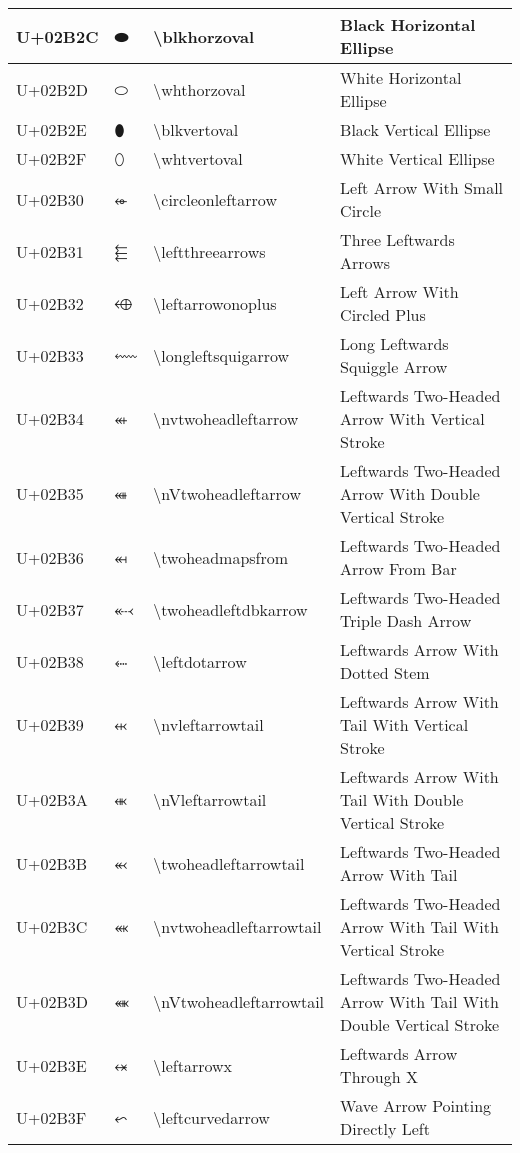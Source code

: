 \begin{table}[h]
\begin{tabulary}{\linewidth}{|L|L|L|L|}
\hline
U+02B2C & ⬬ & {\textbackslash}blkhorzoval & Black Horizontal Ellipse \\
\hline
U+02B2D & ⬭ & {\textbackslash}whthorzoval & White Horizontal Ellipse \\
\hline
U+02B2E & ⬮ & {\textbackslash}blkvertoval & Black Vertical Ellipse \\
\hline
U+02B2F & ⬯ & {\textbackslash}whtvertoval & White Vertical Ellipse \\
\hline
U+02B30 & ⬰ & {\textbackslash}circleonleftarrow & Left Arrow With Small Circle \\
\hline
U+02B31 & ⬱ & {\textbackslash}leftthreearrows & Three Leftwards Arrows \\
\hline
U+02B32 & ⬲ & {\textbackslash}leftarrowonoplus & Left Arrow With Circled Plus \\
\hline
U+02B33 & ⬳ & {\textbackslash}longleftsquigarrow & Long Leftwards Squiggle Arrow \\
\hline
U+02B34 & ⬴ & {\textbackslash}nvtwoheadleftarrow & Leftwards Two-Headed Arrow With Vertical Stroke \\
\hline
U+02B35 & ⬵ & {\textbackslash}nVtwoheadleftarrow & Leftwards Two-Headed Arrow With Double Vertical Stroke \\
\hline
U+02B36 & ⬶ & {\textbackslash}twoheadmapsfrom & Leftwards Two-Headed Arrow From Bar \\
\hline
U+02B37 & ⬷ & {\textbackslash}twoheadleftdbkarrow & Leftwards Two-Headed Triple Dash Arrow \\
\hline
U+02B38 & ⬸ & {\textbackslash}leftdotarrow & Leftwards Arrow With Dotted Stem \\
\hline
U+02B39 & ⬹ & {\textbackslash}nvleftarrowtail & Leftwards Arrow With Tail With Vertical Stroke \\
\hline
U+02B3A & ⬺ & {\textbackslash}nVleftarrowtail & Leftwards Arrow With Tail With Double Vertical Stroke \\
\hline
U+02B3B & ⬻ & {\textbackslash}twoheadleftarrowtail & Leftwards Two-Headed Arrow With Tail \\
\hline
U+02B3C & ⬼ & {\textbackslash}nvtwoheadleftarrowtail & Leftwards Two-Headed Arrow With Tail With Vertical Stroke \\
\hline
U+02B3D & ⬽ & {\textbackslash}nVtwoheadleftarrowtail & Leftwards Two-Headed Arrow With Tail With Double Vertical Stroke \\
\hline
U+02B3E & ⬾ & {\textbackslash}leftarrowx & Leftwards Arrow Through X \\
\hline
U+02B3F & ⬿ & {\textbackslash}leftcurvedarrow & Wave Arrow Pointing Directly Left \\

\end{tabulary}
\end{table}
